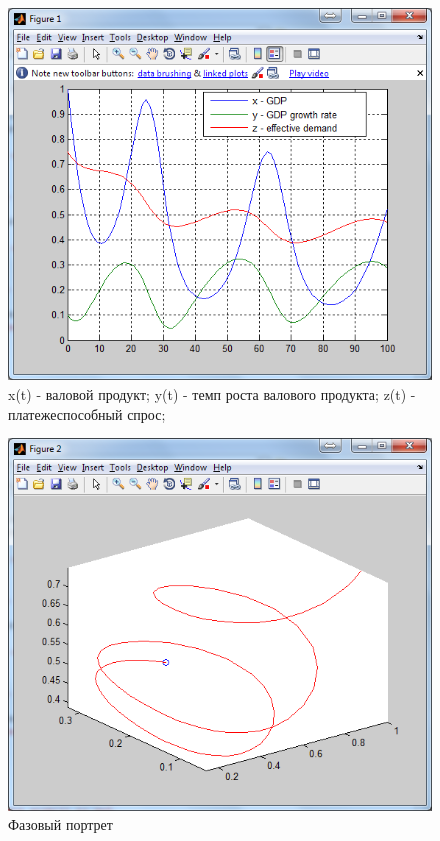 \documentclass{article}
\begin{document}
\begin{figure}
  \includegraphics[width=13cm]{matlab24-1.png}
  \caption{x(t) - валовой продукт; y(t) - темп роста валового продукта; z(t) -
  платежеспособный спрос;}
\end{figure}

\begin{figure}
  \includegraphics[width=13cm]{matlab24-2.png}
  \caption{Фазовый портрет}
\end{figure}
 
\end{document}

